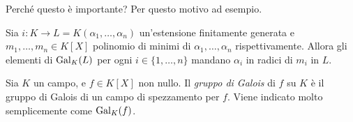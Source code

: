 Perché questo è importante? Per questo motivo ad esempio.

\begin{coro}
Sia \(i : K \to L = K\left(\alpha_1, \dots{}, \alpha_n\right)\) un'estensione finitamente generata e \(m_1, \dots{}, m_n \in K[X]\) polinomio di minimi di \(\alpha_1, \dots{}, \alpha_n\) rispettivamente. Allora gli elementi di \(\Gal[K]L\) per ogni \(i \in \{1, \dots, n\}\) mandano \(\alpha_i\) in radici di \(m_i\) in \(L\).
\end{coro}

%
% 
%
%
%

\begin{defi}
Sia \(K\) un campo, e \(f \in K[X]\) non nullo. Il {\em gruppo di Galois} di \(f\) su \(K\) è il gruppo di Galois di un campo di spezzamento per \(f\). Viene indicato molto semplicemente come \(\Gal[K] f\).
\end{defi}

